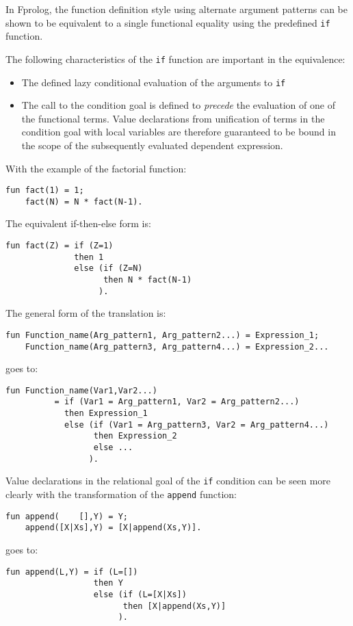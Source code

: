 \documentclass[a4paper,11pt,twoside]{article}
\begin{document}
In Fprolog, the function definition style using alternate argument patterns can
be shown to be equivalent to a single functional equality using the
predefined \texttt{if} function.

The following characteristics of the \texttt{if} function are
important in the equivalence:
\begin{itemize}
\item{The defined lazy conditional evaluation of the arguments to \texttt{if}}
\item{The call to the condition
  goal is defined to \textit{precede} the evaluation of one of the functional terms.
  Value declarations from unification of terms in the condition goal with local
  variables are therefore guaranteed to be bound in the scope of the subsequently
  evaluated dependent expression.}
\end{itemize}

With the example of the factorial function:
\begin{verbatim}
fun fact(1) = 1;
    fact(N) = N * fact(N-1).
\end{verbatim}
The equivalent if-then-else form is:
\begin{verbatim}
fun fact(Z) = if (Z=1)
              then 1
              else (if (Z=N)
                    then N * fact(N-1)
                   ).
\end{verbatim}
The general form of the translation is:
\begin{verbatim}
fun Function_name(Arg_pattern1, Arg_pattern2...) = Expression_1;
    Function_name(Arg_pattern3, Arg_pattern4...) = Expression_2...
\end{verbatim}
goes to:
\begin{verbatim}
fun Function_name(Var1,Var2...)
          = if (Var1 = Arg_pattern1, Var2 = Arg_pattern2...)
            then Expression_1
            else (if (Var1 = Arg_pattern3, Var2 = Arg_pattern4...)
                  then Expression_2
                  else ...
                 ).
\end{verbatim}
Value declarations in the relational goal of the \texttt{if} condition can be seen more
clearly with the transformation of the \texttt{append} function:
\begin{verbatim}
fun append(    [],Y) = Y;
    append([X|Xs],Y) = [X|append(Xs,Y)].
\end{verbatim}
goes to:
\begin{verbatim}
fun append(L,Y) = if (L=[])
                  then Y
                  else (if (L=[X|Xs])
                        then [X|append(Xs,Y)]
                       ).
\end{verbatim}
\end{document}
